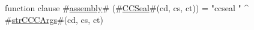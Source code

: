 function clause #\hyperref[sailMIPSzassembly]{assembly}# (#\hyperref[sailMIPSzCCSeal]{CCSeal}#(cd, cs, ct)) = "ccseal " ^ #\hyperref[sailMIPSzstrCCCArgs]{strCCCArgs}#(cd, cs, ct)
